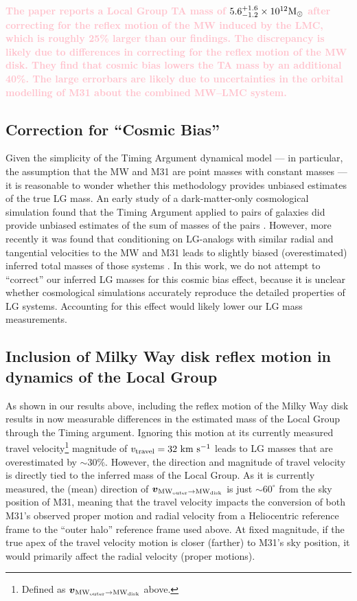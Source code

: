 \documentclass[twocolumn]{aastex631}
\newcommand{\kc}[1]{\textcolor{pink}{\textbf{#1}} }
\newcommand{\bov}{\ensuremath{\boldsymbol{v}}}
\newcommand{\vel}[2]{\ensuremath{\bov_{\rm #1 \to #2}}}
\newcommand{\mwouter}{\ensuremath{\textrm{MW}_\textrm{outer}}}
\newcommand{\mwdisk}{\ensuremath{\textrm{MW}_\textrm{disk}}}
\begin{document}
\kc{The \cite{Benisty2022} paper reports a Local Group TA mass of
$5.6^{+1.6}_{-1.2}\times10^{12}\mathrm{M}_\odot$ after correcting for the reflex motion
of the MW induced by the LMC, which is roughly 25\% larger than our findings.
The discrepancy is likely due to differences in correcting for the reflex motion
of the MW disk.
They find that cosmic bias lowers the TA mass by an additional 40\%.
The large errorbars are likely due to uncertainties in the orbital modelling of
M31 about the combined MW--LMC system.}



\subsection{Correction for ``Cosmic Bias''}

Given the simplicity of the Timing Argument dynamical model --- in particular,
the assumption that the MW and M31 are point masses with constant masses --- it
is reasonable to wonder whether this methodology provides unbiased estimates of
the true LG mass.
An early study of a dark-matter-only cosmological simulation found that the
Timing Argument applied to pairs of galaxies did provide unbiased estimates of
the sum of masses of the pairs \citep{LiWhite2008}.
However, more recently it was found that conditioning on LG-analogs with similar
radial and tangential velocities to the MW and M31 leads to slightly biased
(overestimated) inferred total masses of those systems \citep{Gonzalez2014,
Hartl2021}.
In this work, we do not attempt to ``correct'' our inferred LG masses for this
cosmic bias effect, because it is unclear whether cosmological simulations
accurately reproduce the detailed properties of LG systems.
Accounting for this effect would likely lower our LG mass measurements.


\subsection{Inclusion of Milky Way disk reflex motion in dynamics of the Local Group}

As shown in our results above, including the reflex motion of the Milky Way disk
results in now measurable differences in the estimated mass of the Local Group
through the Timing argument.
Ignoring this motion at its currently measured travel velocity\footnote{Defined
as $\vel{\mwouter}{\mwdisk}$ above.} magnitude of $v_\textrm{travel} = 32~\mathrm{km}~\mathrm{s}^{-1}$
\citep{Petersen2021} leads to LG masses that are overestimated by $\sim30\%$.
However, the direction and magnitude of travel velocity is directly tied to the
inferred mass of the Local Group.
As it is currently measured, the (mean) direction of $\vel{\mwouter}{\mwdisk}$
is just $\sim$$60^\circ$ from the sky position of M31, meaning that the travel
velocity impacts the conversion of both M31's observed proper motion and radial
velocity from a Heliocentric reference frame to the ``outer halo'' reference
frame used above.
At fixed magnitude, if the true apex of the travel velocity motion is closer
(farther) to M31's sky position, it would primarily affect the radial velocity
(proper motions).
\end{document}
